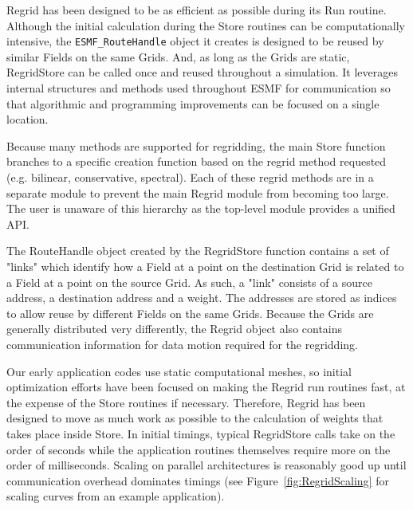 


Regrid has been designed to be as efficient as possible during its
Run routine.  Although the initial calculation during the Store routines
can be computationally intensive, the {\tt ESMF\_RouteHandle} object
it creates is designed to be reused by similar Fields on the same Grids.
And, as long as the Grids are static, RegridStore can be called once
and reused throughout a simulation.  It leverages internal structures
and methods used throughout ESMF for communication so that algorithmic
and programming improvements can be focused on a single location.

Because many methods are supported for regridding, the main Store function
branches to a specific creation function based on the regrid method requested
(e.g. bilinear, conservative, spectral).  Each of these regrid methods are in
a separate module to prevent the main Regrid module from becoming too
large.  The user is unaware of this hierarchy as the top-level module provides
a unified API.

The RouteHandle object created by the RegridStore function contains a set of
"links" which identify how a Field at a point on the destination Grid is
related to a Field at a point on the source Grid.  As such, a "link"
consists of a source address, a destination address and a weight.  The addresses
are stored as indices to allow reuse by different Fields on the same Grids.
Because the Grids are generally distributed very differently, the Regrid object
also contains communication information for data motion required for the
regridding.

Our early application codes use static computational meshes, so initial 
optimization efforts have been focused on making the Regrid run routines 
fast, at the expense of the Store routines if necessary.  Therefore, Regrid
has been designed to move as much work as possible to the calculation of weights
that takes place inside Store.  In initial timings, typical RegridStore calls
take on the order of seconds while the application routines themselves require
more on the order of milliseconds.  Scaling on parallel architectures is
reasonably good up until communication overhead dominates timings (see 
Figure~\ref{fig:RegridScaling} for scaling curves from an example application).

